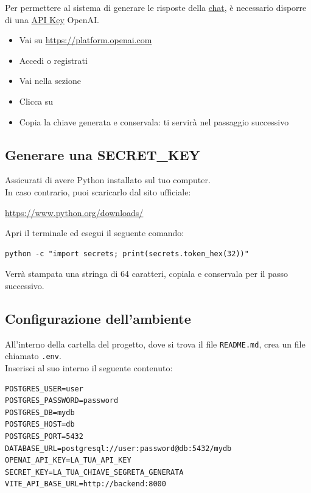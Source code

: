 Per permettere al sistema di generare le risposte della \hyperlink{glossario:chat}{chat}, è necessario disporre di una \hyperlink{glossario:api-key}{API Key} OpenAI.

\begin{itemize}[itemsep=5pt, parsep=5pt, label=$\scriptstyle\bullet$]
	\item Vai su \url{https://platform.openai.com}
	\item Accedi o registrati
	\item Vai nella sezione 
	\item Clicca su 
	\item Copia la chiave generata e conservala: ti servirà nel passaggio successivo
\end{itemize}

\subsection{Generare una SECRET\_KEY}
Assicurati di avere Python installato sul tuo computer. \\
In caso contrario, puoi scaricarlo dal sito ufficiale:
\begin{center}
	\url{https://www.python.org/downloads/}
\end{center}
Apri il terminale ed esegui il seguente comando:
\begin{lstlisting}[style=pseudocodice]
	python -c "import secrets; print(secrets.token_hex(32))"
\end{lstlisting}
Verrà stampata una stringa di 64 caratteri, copiala e conservala per il passo successivo.

\subsection{Configurazione dell'ambiente}

All'interno della cartella del progetto, dove si trova il file \texttt{README.md}, crea un file chiamato \texttt{.env}.\\
Inserisci al suo interno il seguente contenuto:

\begin{lstlisting}[style=pseudocodice]
POSTGRES_USER=user
POSTGRES_PASSWORD=password
POSTGRES_DB=mydb
POSTGRES_HOST=db
POSTGRES_PORT=5432
DATABASE_URL=postgresql://user:password@db:5432/mydb
OPENAI_API_KEY=LA_TUA_API_KEY
SECRET_KEY=LA_TUA_CHIAVE_SEGRETA_GENERATA
VITE_API_BASE_URL=http://backend:8000
\end{lstlisting}

